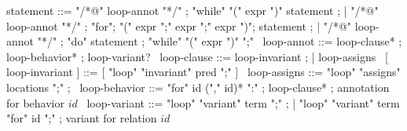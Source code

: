 \begin{syntax}
  statement ::= "/*@" loop-annot "*/" ;
  "while" "(" expr ")" statement ;
  | "/*@" loop-annot "*/" ;
  "for";
  "(" expr ";" expr ";" expr ")";
  statement ;
  | "/*@" loop-annot "*/" ;
  "do" statement ;
  "while" "(" expr ")" ";"
  \
  loop-annot ::= loop-clause* ;
  loop-behavior* ;
  loop-variant?
  \
  loop-clause ::= loop-invariant ;
                | loop-assigns
  \
  [ loop-invariant ] ::= [ "loop" "invariant" pred ";" ]
  \
  loop-assigns ::= "loop"
                   "assigns" locations ";" ;
  \
  loop-behavior ::= "for" id ("," id)* ":" ;
  loop-clause* ; annotation for behavior $id$
  \
  loop-variant ::= "loop" "variant" term ";" ;
  | "loop" "variant" term "for" id ";" ; variant for relation $id$
\end{syntax}
